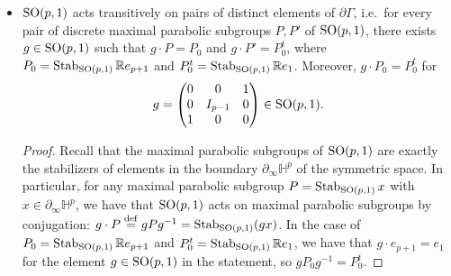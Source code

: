 \documentclass{report}
\begin{document}
\begin{itemize}
\begin{proof}
\[\begin{tikzcd}
            T_{h \cdot P_0} \partial \Gamma \arrow{r}{d_{h \cdot P_0}\xi} & T_{\mathbb R \eta} \mathbb P(\Sym_0 \mathbb R^{p,1}) \arrow{r}{\simeq} & \hom(\mathbb R \eta, \Sym_0 \mathbb R^{p,1}/\mathbb R \eta)
        \end{tikzcd}
        \]
        where $\pi$ is the projection.
    \end{proof}
    \item $\operatorname{{\mathrm{SO}}}(p,1)$ acts transitively on pairs of distinct elements of $\partial \Gamma$, i.e.\ for every pair of discrete maximal parabolic subgroups $P, P'$ of $\operatorname{{\mathrm{SO}}}(p,1)$, there exists $g \in \operatorname{{\mathrm{SO}}}(p,1)$ such that $g \cdot P = P_0$ and $g \cdot P' = P_0^t$, where $P_0 = \operatorname{Stab}_{\operatorname{{\mathrm{SO}}}(p,1)} \mathbb R e_{p+1}$ and $P_0^t = \operatorname{Stab}_{\operatorname{{\mathrm{SO}}}(p,1)} \mathbb R e_1$.
    Moreover, $g \cdot P_0 = P_0^t$ for 
    \[
    g = \begin{pmatrix}
        0 & 0 & 1 \\
        0 & I_{p-1} & 0 \\
        1 & 0 & 0
    \end{pmatrix} \in \operatorname{{\mathrm{SO}}}(p,1).
    \]
    \begin{proof}
        Recall that the maximal parabolic subgroups of $\operatorname{{\mathrm{SO}}}(p,1)$ are exactly the stabilizers of elements in the boundary $\partial_\infty \mathbb H^p$ of the symmetric space.
        In particular, for any maximal parabolic subgroup $P = \operatorname{Stab}_{\operatorname{{\mathrm{SO}}}(p,1)}x$ with $x \in \partial_\infty \mathbb H^p$, we have that $\operatorname{{\mathrm{SO}}}(p,1)$ acts on maximal parabolic subgroups by conjugation: $g \cdot P \overset{\mathrm{def}}{=} g P g^{-1} = \operatorname{Stab}_{\operatorname{{\mathrm{SO}}}(p,1)}(g x)$.
        In the case of $P_0 = \operatorname{Stab}_{\operatorname{{\mathrm{SO}}}(p,1)} \mathbb R e_{p+1}$ and $P_0^t = \operatorname{Stab}_{\operatorname{{\mathrm{SO}}}(p,1)} \mathbb R e_1$, we have that $g \cdot e_{p+1} = e_1$ for the element $g \in \operatorname{{\mathrm{SO}}}(p,1)$ in the statement, so $g P_0 g^{-1} = P_0^t$.


\end{proof}
\end{itemize}
\end{document}
